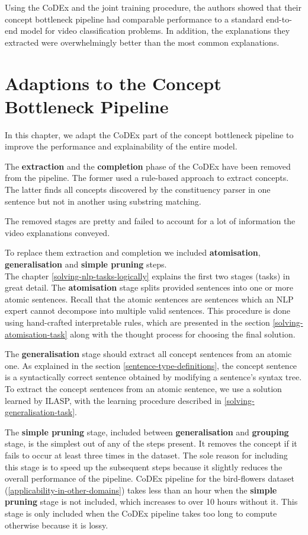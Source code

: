 Using the CoDEx and the joint training procedure, the authors showed that their concept bottleneck pipeline had comparable performance to a standard end-to-end model for video classification problems.
In addition, the explanations they extracted were overwhelmingly better than the most common explanations.

\section{Adaptions to the Concept Bottleneck Pipeline}

In this chapter, we adapt the CoDEx part of the concept bottleneck pipeline to improve the performance and explainability of the entire model.

The \textbf{extraction} and the \textbf{completion} phase of the CoDEx have been removed from the pipeline.
The former used a rule-based approach to extract concepts.
The latter finds all concepts discovered by the constituency parser in one sentence but not in another using substring matching.

The removed stages are pretty and failed to account for a lot of information the video explanations conveyed.

To replace them extraction and completion we included \textbf{atomisation}, \textbf{generalisation} and \textbf{simple pruning} steps. \\
The chapter \ref{solving-nlp-tasks-logically} explains the first two stages (tasks) in great detail.
The \textbf{atomisation} stage splits provided sentences into one or more atomic sentences. 
Recall that the atomic sentences are sentences which an NLP expert cannot decompose into multiple valid sentences.
This procedure is done using hand-crafted interpretable rules, which are presented in the section \ref{solving-atomisation-task} along with the thought process for choosing the final solution.

The \textbf{generalisation} stage should extract all concept sentences from an atomic one. 
As explained in the section \ref{sentence-type-definitions}, the concept sentence is a syntactically correct sentence obtained by modifying a sentence's syntax tree.
To extract the concept sentences from an atomic sentence, we use a solution learned by ILASP, with the learning procedure described in \ref{solving-generalisation-task}.

The \textbf{simple pruning} stage, included between \textbf{generalisation} and \textbf{grouping} stage, is the simplest out of any of the steps present. 
It removes the concept if it fails to occur at least three times in the dataset.
The sole reason for including this stage is to speed up the subsequent steps because it slightly reduces the overall performance of the pipeline.
CoDEx pipeline for the bird-flowers dataset (\ref{applicability-in-other-domains}) takes less than an hour when the \textbf{simple pruning} stage is not included, which increases to over 10 hours without it.
This stage is only included when the CoDEx pipeline takes too long to compute otherwise because it is lossy.

